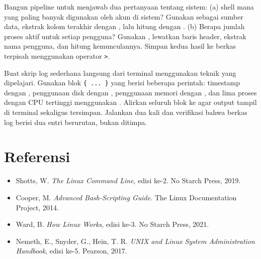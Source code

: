 \begin{exercisebox}
Bangun pipeline untuk menjawab dua pertanyaan tentang sistem: (a) shell mana yang paling banyak digunakan oleh akun di sistem? Gunakan  sebagai sumber data, ekstrak kolom terakhir dengan , lalu hitung dengan . (b) Berapa jumlah proses aktif untuk setiap pengguna? Gunakan , lewatkan baris header, ekstrak nama pengguna, dan hitung kemunculannya. Simpan kedua hasil ke berkas terpisah menggunakan operator \texttt{>}.
\end{exercisebox}

\begin{exercisebox}
Buat skrip log sederhana langsung dari terminal menggunakan teknik yang dipelajari. Gunakan blok \texttt{\{ ... \}} yang berisi beberapa perintah: timestamp dengan , penggunaan disk dengan , penggunaan memori dengan , dan lima proses dengan CPU tertinggi menggunakan . Alirkan seluruh blok ke  agar output tampil di terminal sekaligus tersimpan. Jalankan dua kali dan verifikasi bahwa berkas log berisi dua entri berurutan, bukan ditimpa.
\end{exercisebox}

\section{Referensi}

\begin{itemize}
    \item Shotts, W. \textit{The Linux Command Line}, edisi ke-2. No Starch Press, 2019.
    \item Cooper, M. \textit{Advanced Bash-Scripting Guide}. The Linux Documentation Project, 2014.
    \item Ward, B. \textit{How Linux Works}, edisi ke-3. No Starch Press, 2021.
    \item Nemeth, E., Snyder, G., Hein, T. R. \textit{UNIX and Linux System Administration Handbook}, edisi ke-5. Pearson, 2017.
\end{itemize}
